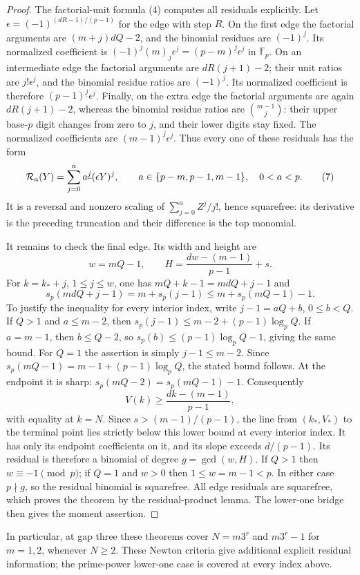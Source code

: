\documentclass[11pt]{article}
\begin{document}
\begin{proof}
The factorial-unit formula (4) computes all residuals explicitly.
Let $\epsilon=(-1)^{(dR-1)/(p-1)}$ for the edge with step $R$.
On the first edge the factorial arguments are
$(m+j)dQ-2$, and the binomial residues are $(-1)^j$.
Its normalized coefficient is
$(-1)^j(m)_j\epsilon^j=(p-m)^{\underline j}\epsilon^j$
in $\mathbb F_p$.
On an intermediate edge the factorial arguments are
$dR(j+1)-2$; their unit ratios are $j!\epsilon^j$,
and the binomial residue ratios are $(-1)^j$.
Its normalized coefficient is therefore
$(p-1)^{\underline j}\epsilon^j$.
Finally, on the extra edge the factorial arguments are again
$dR(j+1)-2$, whereas the binomial residue ratios are
$\binom{m-1}j$: their upper base-$p$ digit changes from zero to
$j$, and their lower digits stay fixed.
The normalized coefficients are $(m-1)^{\underline j}\epsilon^j$.
Thus every one of these residuals has the form
\[
 {\cal R}_a(Y)=\sum_{j=0}^{a}a^{\underline j}(\epsilon Y)^j,
 \qquad a\in\{p-m,p-1,m-1\},\quad 0<a<p.                    \tag{7}
\]
It is a reversal and nonzero scaling of
$\sum_{j=0}^a Z^j/j!$, hence squarefree: its derivative is
the preceding truncation and their difference is the top monomial.

It remains to check the final edge. Its width and height are
\[
 w=mQ-1,\qquad
 H=\frac{dw-(m-1)}{p-1}+s.
\]
For $k=k_*+j$, $1\le j\le w$, one has
$mQ+k-1=mdQ+j-1$ and
\[
 s_p(mdQ+j-1)=m+s_p(j-1)
 \le m+s_p(mQ-1)-1.
\]
To justify the inequality for every interior index, write
$j-1=aQ+b$, $0\le b<Q$. If $Q>1$ and $a\le m-2$,
then $s_p(j-1)\le m-2+(p-1)\log_p Q$.
If $a=m-1$, then $b\le Q-2$, so
$s_p(b)\le(p-1)\log_p Q-1$, giving the same bound.
For $Q=1$ the assertion is simply $j-1\le m-2$.
Since $s_p(mQ-1)=m-1+(p-1)\log_p Q$, the stated bound follows.
At the endpoint it is sharp:
$s_p(mQ-2)=s_p(mQ-1)-1$.
Consequently
\[
 V(k)\ge\frac{dk-(m-1)}{p-1},
\]
with equality at $k=N$. Since $s>(m-1)/(p-1)$, the line from
$(k_*,V_*)$ to the terminal point lies strictly below this lower
bound at every interior index. It has only its endpoint coefficients
on it, and its slope exceeds $d/(p-1)$.
Its residual is therefore a binomial of degree $g=\gcd(w,H)$.
If $Q>1$ then $w\equiv-1\pmod p$; if $Q=1$ and $w>0$ then
$1\le w=m-1<p$. In either case $p\nmid g$, so the residual
binomial is squarefree. All edge residuals are squarefree,
which proves the theorem by the residual-product lemma.
The lower-one bridge then gives the moment assertion.
\end{proof}

In particular, at gap three these theorems cover
$N=m3^r$ and $m3^r-1$ for $m=1,2$, whenever $N\ge2$.
These Newton criteria give additional explicit residual information;
the prime-power lower-one case is covered at every index above.
\end{document}

